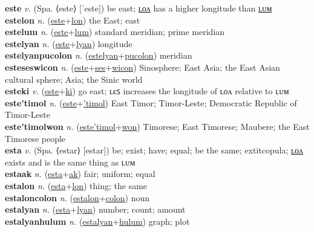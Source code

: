 \textbf{este} \textit{v.} (Spa. ⟨este⟩ [ˈeste])
be east; \hyperref[estelon]{ʟᴏᴧ} has a higher longitude than \hyperref[estelum]{ʟᴜᴍ} \label{este} \\
\textbf{estelon} \textit{n.} (\hyperref[este]{este}+\hyperref[lon]{lon})
the East; east \label{estelon} \\
\textbf{estelum} \textit{n.} (\hyperref[este]{este}+\hyperref[lum]{lum})
standard meridian; prime meridian \label{estelum} \\
\textbf{estelyan} \textit{n.} (\hyperref[este]{este}+\hyperref[lyan]{lyan})
longitude \label{estelyan} \\
\textbf{estelyanpucolon} \textit{n.} (\hyperref[estelyan]{estelyan}+\hyperref[pucolon]{pucolon})
meridian \label{estelyanpucolon} \\
\textbf{esteseswicon} \textit{n.} (\hyperref[este]{este}+\hyperref[ses]{ses}+\hyperref[wicon]{wicon})
Sinosphere; East Asia; the East Asian cultural sphere; Asia; the Sinic world \label{esteseswicon} \\
\textbf{esteki} \textit{v.} (\hyperref[este]{este}+\hyperref[ki]{ki})
go east; ʟєꜱ increases the longitude of ʟᴏᴧ relative to ʟᴜᴍ \label{esteki} \\
\textbf{este'timol} \textit{n.} (\hyperref[este]{este}+\hyperref['timol]{'timol})
East Timor; Timor-Leste; Democratic Republic of Timor-Leste \label{este'timol} \\
\textbf{este'timolwon} \textit{n.} (\hyperref[este'timol]{este'timol}+\hyperref[won]{won})
Timorese; East Timorese; Maubere; the East Timorese people \label{este'timolwon} \\
\textbf{esta} \textit{v.} (Spa. ⟨estar⟩ [estar])
be; exist; have; equal; be the same; 	extit{copula}; \hyperref[estalon]{ʟᴏᴧ} exists and is the same thing as ʟᴜᴍ \label{esta} \\
\textbf{estaak} \textit{n.} (\hyperref[esta]{esta}+\hyperref[ak]{ak})
fair; uniform; equal \label{estaak} \\
\textbf{estalon} \textit{n.} (\hyperref[esta]{esta}+\hyperref[lon]{lon})
thing; the same \label{estalon} \\
\textbf{estaloncolon} \textit{n.} (\hyperref[estalon]{estalon}+\hyperref[colon]{colon})
noun \label{estaloncolon} \\
\textbf{estalyan} \textit{n.} (\hyperref[esta]{esta}+\hyperref[lyan]{lyan})
number; count; amount \label{estalyan} \\
\textbf{estalyanhulum} \textit{n.} (\hyperref[estalyan]{estalyan}+\hyperref[hulum]{hulum})
graph; plot \label{estalyanhulum} \\
